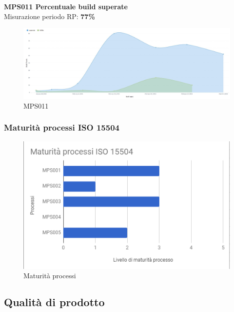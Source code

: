 \documentclass[PianoDiQualifica.tex]{subfiles}
\begin{document}
\newpage

\textbf{MPS011 Percentuale build superate}\\
Misurazione periodo RP: \textbf{77\%}
\begin{figure}[htb]
	\centering
	\includegraphics[width=1\linewidth]{RP/MPS011}
	\caption{MPS011}
	\label{fig:processi}
\end{figure}

\subsubsection{Maturità processi ISO 15504}
\begin{figure}[htbp]
	\centering
	\includegraphics[width=0.7\linewidth]{RP/Processi}
	\caption{Maturità processi}
	\label{fig:processi}
\end{figure}


\newpage
\subsection{Qualità di prodotto}
\end{document}
